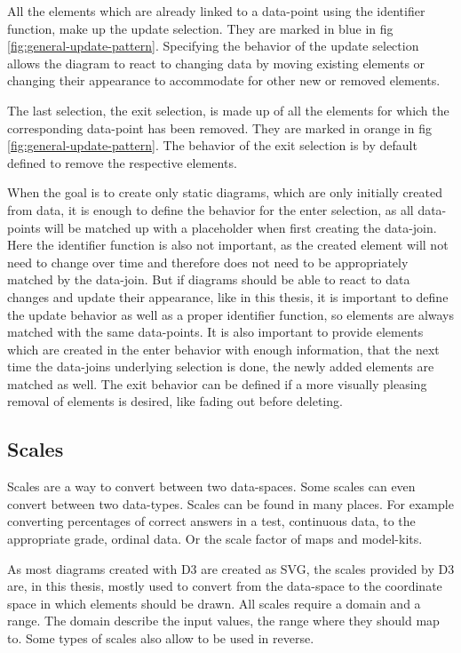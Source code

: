 All the elements which are already linked to a data-point using the identifier function, make up the update selection. They are marked in blue in fig \ref{fig:general-update-pattern}. Specifying the behavior of the update selection allows the diagram to react to changing data by moving existing elements or changing their appearance to accommodate for other new or removed elements.

The last selection, the exit selection, is made up of all the elements for which the corresponding data-point has been removed. They are marked in orange in fig \ref{fig:general-update-pattern}. The behavior of the exit selection is by default defined to remove the respective elements.

When the goal is to create only static diagrams, which are only initially created from data, it is enough to define the behavior for the enter selection, as all data-points will be matched up with a placeholder when first creating the data-join. Here the identifier function is also not important, as the created element will not need to change over time and therefore does not need to be appropriately matched by the data-join. But if diagrams should be able to react to data changes and update their appearance, like in this thesis, it is important to define the update behavior as well as a proper identifier function, so elements are always matched with the same data-points. It is also important to provide elements which are created in the enter behavior with enough information, that the next time the data-joins underlying selection is done, the newly added elements are matched as well. The exit behavior can be defined if a more visually pleasing removal of elements is desired, like fading out before deleting.


\subsection{Scales}

Scales are a way to convert between two data-spaces. Some scales can even convert between two data-types. Scales can be found in many places. For example converting percentages of correct answers in a test, continuous data, to the appropriate grade, ordinal data. Or the scale factor of maps and model-kits.

As most diagrams created with D3 are created as SVG, the scales provided by D3 are, in this thesis, mostly used to convert from the data-space to the coordinate space in which elements should be drawn. All scales require a domain and a range. The domain describe the input values, the range where they should map to. Some types of scales also allow to be used in reverse. 


